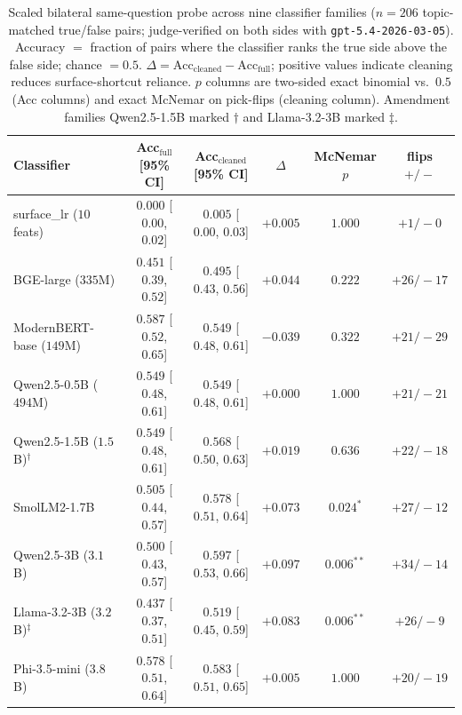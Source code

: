 \begin{table}[H]
\centering
\small
\caption{Scaled bilateral same-question probe across nine classifier
families ($n=206$ topic-matched true/false pairs; judge-verified on
both sides with \texttt{gpt-5.4-2026-03-05}).
Accuracy $=$ fraction of pairs where the classifier ranks the true
side above the false side; chance $=0.5$.
$\Delta = \text{Acc}_\text{cleaned} - \text{Acc}_\text{full}$;
positive values indicate cleaning reduces surface-shortcut reliance.
$p$ columns are two-sided exact binomial vs.\ $0.5$ (Acc columns) and
exact McNemar on pick-flips (cleaning column). Amendment families
Qwen2.5-1.5B marked $\dagger$ and Llama-3.2-3B marked $\ddagger$.}
\label{tab:bilateral_probe_scaled}
\begin{tabular}{@{}lccccc@{}}
\toprule
Classifier & Acc$_\text{full}$ [95\% CI] & Acc$_\text{cleaned}$ [95\% CI] & $\Delta$ & McNemar $p$ & flips $+/-$ \\
\midrule
surface\_lr ($10$ feats)    & $0.000$ [$0.00$, $0.02$] & $0.005$ [$0.00$, $0.03$] & $+0.005$ & $1.000$    & $+1/-0$  \\
BGE-large ($335$M)          & $0.451$ [$0.39$, $0.52$] & $0.495$ [$0.43$, $0.56$] & $+0.044$ & $0.222$    & $+26/-17$ \\
ModernBERT-base ($149$M)    & $0.587$ [$0.52$, $0.65$] & $0.549$ [$0.48$, $0.61$] & $-0.039$ & $0.322$    & $+21/-29$ \\
Qwen2.5-0.5B ($494$M)       & $0.549$ [$0.48$, $0.61$] & $0.549$ [$0.48$, $0.61$] & $+0.000$ & $1.000$    & $+21/-21$ \\
Qwen2.5-1.5B ($1.5$B)$^\dagger$ & $0.549$ [$0.48$, $0.61$] & $0.568$ [$0.50$, $0.63$] & $+0.019$ & $0.636$    & $+22/-18$ \\
SmolLM2-1.7B                & $0.505$ [$0.44$, $0.57$] & $0.578$ [$0.51$, $0.64$] & $+0.073$ & $0.024^{*}$  & $+27/-12$ \\
Qwen2.5-3B ($3.1$B)         & $0.500$ [$0.43$, $0.57$] & $0.597$ [$0.53$, $0.66$] & $+0.097$ & $0.006^{**}$ & $+34/-14$ \\
Llama-3.2-3B ($3.2$B)$^\ddagger$ & $0.437$ [$0.37$, $0.51$] & $0.519$ [$0.45$, $0.59$] & $+0.083$ & $0.006^{**}$ & $+26/-9$  \\
Phi-3.5-mini ($3.8$B)       & $0.578$ [$0.51$, $0.64$] & $0.583$ [$0.51$, $0.65$] & $+0.005$ & $1.000$    & $+20/-19$ \\
\bottomrule
\end{tabular}
\end{table}


